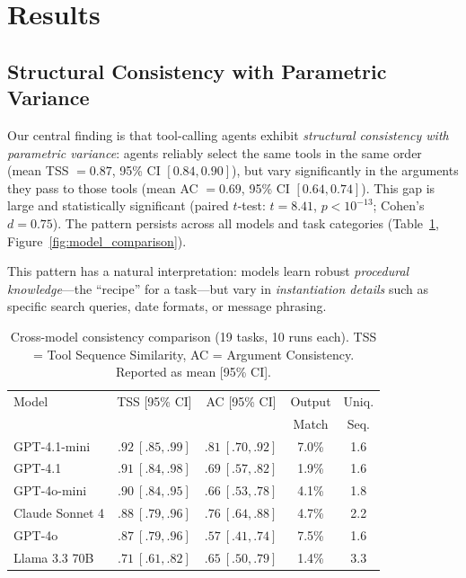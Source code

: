 \documentclass[letterpaper]{article}
\begin{document}
\section{Results}

\subsection{Structural Consistency with Parametric Variance}

Our central finding is that tool-calling agents exhibit \textit{structural consistency with parametric variance}: agents reliably select the same tools in the same order (mean TSS $= 0.87$, 95\% CI $[0.84, 0.90]$), but vary significantly in the arguments they pass to those tools (mean AC $= 0.69$, 95\% CI $[0.64, 0.74]$). This gap is large and statistically significant (paired $t$-test: $t = 8.41$, $p < 10^{-13}$; Cohen's $d = 0.75$). The pattern persists across all models and task categories (Table~\ref{tab:model_comparison}, Figure~\ref{fig:model_comparison}).

This pattern has a natural interpretation: models learn robust \textit{procedural knowledge}---the ``recipe'' for a task---but vary in \textit{instantiation details} such as specific search queries, date formats, or message phrasing.

\begin{table}[t]
\centering
\caption{Cross-model consistency comparison (19 tasks, 10 runs each). TSS = Tool Sequence Similarity, AC = Argument Consistency. Reported as mean [95\% CI].}
\label{tab:model_comparison}
\small
\begin{tabular}{lcccc}
\toprule
Model & TSS [95\% CI] & AC [95\% CI] & Output & Uniq. \\
 & & & Match & Seq. \\
\midrule
GPT-4.1-mini & $.92\ [.85, .99]$ & $.81\ [.70, .92]$ & 7.0\% & 1.6 \\
GPT-4.1 & $.91\ [.84, .98]$ & $.69\ [.57, .82]$ & 1.9\% & 1.6 \\
GPT-4o-mini & $.90\ [.84, .95]$ & $.66\ [.53, .78]$ & 4.1\% & 1.8 \\
Claude Sonnet 4 & $.88\ [.79, .96]$ & $.76\ [.64, .88]$ & 4.7\% & 2.2 \\
GPT-4o & $.87\ [.79, .96]$ & $.57\ [.41, .74]$ & 7.5\% & 1.6 \\
Llama 3.3 70B & $.71\ [.61, .82]$ & $.65\ [.50, .79]$ & 1.4\% & 3.3 \\
\bottomrule
\end{tabular}
\end{table}
\end{document}
